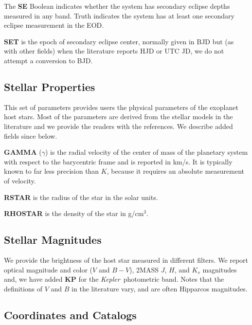 \documentclass[11pt,preprint]{aastex}
\def\kepler{\textit{Kepler}}
\begin{document}
\begin{CJK*}{UTF8}{gbsn}
The {\bf SE} Boolean indicates whether the system has secondary
eclipse depths measured in any band.  Truth indicates the
system has at least one secondary eclipse measurement in the EOD.

{\bf SET} is the epoch of secondary eclipse center, normally given in BJD but (as with other fields) when the literature reports HJD or UTC JD, we do not attempt a conversion to BJD. 

\subsection{Stellar Properties}\label{sec:stellarprop}

This set of parameters provides users the physical parameters of
the exoplanet host stars.  Most of the parameters are derived from the
stellar models in the literature and we provide the readers with the
references. We describe added fields since \cite{Wright2011} below.

{\bf GAMMA} ($\gamma$) is the radial velocity of the center of mass of
the planetary system with respect to the barycentric frame and is
reported in km/s.  It is typically known to far less precision than
$K$, because it requires an absolute measurement of velocity.

{\bf RSTAR} is the radius of the star in the solar units.

{\bf RHOSTAR} is the density of the star in g/cm$^3$.

\subsection{Stellar Magnitudes}\label{sec:stellarmag}

We provide the brightness of the host star measured in different
filters. We report optical magnitude and color ($V$ and $B-V$),
2MASS $J$, $H$, and $K_s$ magnitudes and, we have added {\bf KP} for
the \kepler\ photometric band. Notes that the definitions of $V$ and $B$ in the literature vary, and are often Hipparcos magnitudes.


\subsection{Coordinates and Catalogs}\label{sec:coord}


\end{CJK*}
\end{document}
